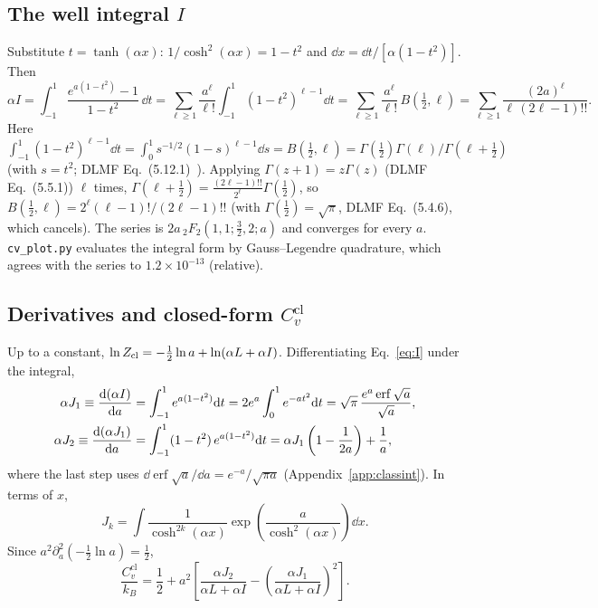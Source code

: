\documentclass[11pt]{article}
\numberwithin{equation}{section}
\providecommand{\erf}{\operatorname{erf}}
\newcommand{\Ccl}{C_v^{\mathrm{cl}}}
\newcommand{\kB}{k_{B}}
\begin{document}
\subsection{The well integral \texorpdfstring{$I$}{I}}
Substitute $t=\tanh(\alpha x)$: $1/\cosh^2(\alpha x)=1-t^2$ and $\dd x=\dd t/[\alpha(1-t^2)]$. Then
\begin{equation}
\alpha I=\int_{-1}^{1}\frac{e^{a(1-t^2)}-1}{1-t^2}\,\dd t
=\sum_{\ell\ge1}\frac{a^\ell}{\ell!}\int_{-1}^{1}(1-t^2)^{\ell-1}\dd t
=\sum_{\ell\ge1}\frac{a^\ell}{\ell!}\,B\!\left(\tfrac12,\ell\right)
=\sum_{\ell\ge1}\frac{(2a)^\ell}{\ell\,(2\ell-1)!!}.
\label{eq:I}
\end{equation}
Here $\int_{-1}^1(1-t^2)^{\ell-1}\dd t=\int_0^1s^{-1/2}(1-s)^{\ell-1}\dd s=B(\tfrac12,\ell)=\Gamma(\tfrac12)\Gamma(\ell)/\Gamma(\ell+\tfrac12)$ (with $s=t^2$; DLMF Eq.~(5.12.1)~\cite{dlmf}). Applying $\Gamma(z+1)=z\Gamma(z)$ (DLMF Eq.~(5.5.1)) $\ell$ times, $\Gamma(\ell+\tfrac12)=\frac{(2\ell-1)!!}{2^\ell}\Gamma(\tfrac12)$, so $B(\tfrac12,\ell)=2^\ell(\ell-1)!/(2\ell-1)!!$ (with $\Gamma(\tfrac12)=\sqrt\pi$, DLMF Eq.~(5.4.6), which cancels). The series is $2a\,{}_2F_2(1,1;\tfrac32,2;a)$ and converges for every $a$. \texttt{cv\_plot.py} evaluates the integral form by Gauss--Legendre quadrature, which agrees with the series to $1.2\times10^{-13}$ (relative).

\subsection{Derivatives and closed-form \texorpdfstring{$\Ccl$}{Ccl}}
Up to a constant, $\ln Z_{\rm cl}=-\frac12\ln a+\ln(\alpha L+\alpha I)$. Differentiating Eq.~\eqref{eq:I} under the integral,
\begin{align}
\alpha J_1\equiv\dv{(\alpha I)}{a}&=\int_{-1}^{1}e^{a(1-t^2)}\dd t=2e^{a}\int_0^1e^{-at^2}\dd t=\sqrt\pi\,\frac{e^{a}\erf\sqrt a}{\sqrt a},\\
\alpha J_2\equiv\dv{(\alpha J_1)}{a}&=\int_{-1}^{1}(1-t^2)\,e^{a(1-t^2)}\dd t=\alpha J_1\left(1-\frac{1}{2a}\right)+\frac1a,
\end{align}
where the last step uses $\dd\erf\sqrt a/\dd a=e^{-a}/\sqrt{\pi a}$ (Appendix~\ref{app:classint}). In terms of $x$,
\[
J_k=\int\frac{1}{\cosh^{2k}(\alpha x)}\exp\!\left(\frac{a}{\cosh^2(\alpha x)}\right)\dd x .
\]
Since $a^2\partial_a^2(-\frac12\ln a)=\frac12$,
\begin{equation}
\boxed{\;\frac{\Ccl}{\kB}=\frac12+a^2\left[\frac{\alpha J_2}{\alpha L+\alpha I}-\left(\frac{\alpha J_1}{\alpha L+\alpha I}\right)^2\right].\;}
\label{eq:Ccl}
\end{equation}
\end{document}
